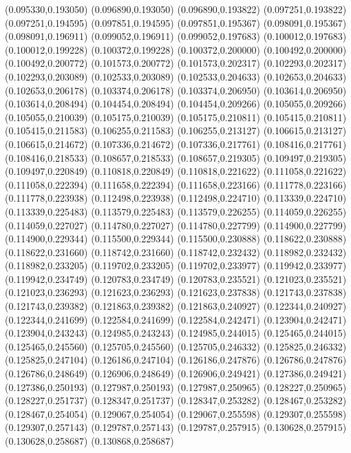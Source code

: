 (0.095330,0.193050)
(0.096890,0.193050)
(0.096890,0.193822)
(0.097251,0.193822)
(0.097251,0.194595)
(0.097851,0.194595)
(0.097851,0.195367)
(0.098091,0.195367)
(0.098091,0.196911)
(0.099052,0.196911)
(0.099052,0.197683)
(0.100012,0.197683)
(0.100012,0.199228)
(0.100372,0.199228)
(0.100372,0.200000)
(0.100492,0.200000)
(0.100492,0.200772)
(0.101573,0.200772)
(0.101573,0.202317)
(0.102293,0.202317)
(0.102293,0.203089)
(0.102533,0.203089)
(0.102533,0.204633)
(0.102653,0.204633)
(0.102653,0.206178)
(0.103374,0.206178)
(0.103374,0.206950)
(0.103614,0.206950)
(0.103614,0.208494)
(0.104454,0.208494)
(0.104454,0.209266)
(0.105055,0.209266)
(0.105055,0.210039)
(0.105175,0.210039)
(0.105175,0.210811)
(0.105415,0.210811)
(0.105415,0.211583)
(0.106255,0.211583)
(0.106255,0.213127)
(0.106615,0.213127)
(0.106615,0.214672)
(0.107336,0.214672)
(0.107336,0.217761)
(0.108416,0.217761)
(0.108416,0.218533)
(0.108657,0.218533)
(0.108657,0.219305)
(0.109497,0.219305)
(0.109497,0.220849)
(0.110818,0.220849)
(0.110818,0.221622)
(0.111058,0.221622)
(0.111058,0.222394)
(0.111658,0.222394)
(0.111658,0.223166)
(0.111778,0.223166)
(0.111778,0.223938)
(0.112498,0.223938)
(0.112498,0.224710)
(0.113339,0.224710)
(0.113339,0.225483)
(0.113579,0.225483)
(0.113579,0.226255)
(0.114059,0.226255)
(0.114059,0.227027)
(0.114780,0.227027)
(0.114780,0.227799)
(0.114900,0.227799)
(0.114900,0.229344)
(0.115500,0.229344)
(0.115500,0.230888)
(0.118622,0.230888)
(0.118622,0.231660)
(0.118742,0.231660)
(0.118742,0.232432)
(0.118982,0.232432)
(0.118982,0.233205)
(0.119702,0.233205)
(0.119702,0.233977)
(0.119942,0.233977)
(0.119942,0.234749)
(0.120783,0.234749)
(0.120783,0.235521)
(0.121023,0.235521)
(0.121023,0.236293)
(0.121623,0.236293)
(0.121623,0.237838)
(0.121743,0.237838)
(0.121743,0.239382)
(0.121863,0.239382)
(0.121863,0.240927)
(0.122344,0.240927)
(0.122344,0.241699)
(0.122584,0.241699)
(0.122584,0.242471)
(0.123904,0.242471)
(0.123904,0.243243)
(0.124985,0.243243)
(0.124985,0.244015)
(0.125465,0.244015)
(0.125465,0.245560)
(0.125705,0.245560)
(0.125705,0.246332)
(0.125825,0.246332)
(0.125825,0.247104)
(0.126186,0.247104)
(0.126186,0.247876)
(0.126786,0.247876)
(0.126786,0.248649)
(0.126906,0.248649)
(0.126906,0.249421)
(0.127386,0.249421)
(0.127386,0.250193)
(0.127987,0.250193)
(0.127987,0.250965)
(0.128227,0.250965)
(0.128227,0.251737)
(0.128347,0.251737)
(0.128347,0.253282)
(0.128467,0.253282)
(0.128467,0.254054)
(0.129067,0.254054)
(0.129067,0.255598)
(0.129307,0.255598)
(0.129307,0.257143)
(0.129787,0.257143)
(0.129787,0.257915)
(0.130628,0.257915)
(0.130628,0.258687)
(0.130868,0.258687)
